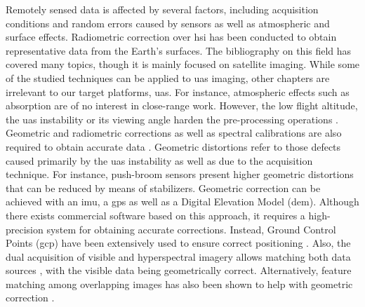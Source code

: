Remotely sensed data is affected by several factors, including acquisition conditions and random errors caused by sensors as well as atmospheric and surface effects. Radiometric correction over \acrshort{hsi} has been conducted to obtain representative data from the Earth's surfaces. The bibliography on this field has covered many topics, though it is mainly focused on satellite imaging. While some of the studied techniques can be applied to \acrshort{uas} imaging, other chapters are irrelevant to our target platforms, \acrshort{uas}. For instance, atmospheric effects such as absorption are of no interest in close-range work. However, the low flight altitude, the \acrshort{uas} instability or its viewing angle harden the pre-processing operations \cite{jakob_need_2017}. Geometric and radiometric corrections as well as spectral calibrations are also required to obtain accurate data \cite{adao_hyperspectral_2017}. Geometric distortions refer to those defects caused primarily by the \acrshort{uas} instability as well as due to the acquisition technique. For instance, push-broom sensors present higher geometric distortions that can be reduced by means of stabilizers. Geometric correction can be achieved with an \acrshort{imu}, a \acrshort{gps} as well as a Digital Elevation Model (\acrshort{dem}). Although there exists commercial software based on this approach, it requires a high-precision system for obtaining accurate corrections. Instead, Ground Control Points (\acrshort{gcp}) have been extensively used to ensure correct positioning \cite{ramirez-paredes_low-altitude_2016}. Also, the dual acquisition of visible and hyperspectral imagery allows matching both data sources \cite{jurado_efficient_2021, xue_compact_2021, ramirez-paredes_low-altitude_2016}, with the visible data being geometrically correct. Alternatively, feature matching among overlapping images has also been shown to help with geometric correction \cite{akhoundi_khezrabad_new_2022}.

